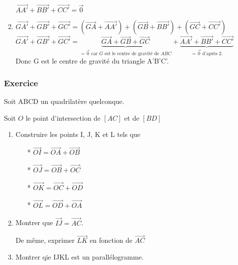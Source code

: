 \begin{enumerate}
$ \overrightarrow{AA'} + \overrightarrow{BB'} + \overrightarrow{CC'} = \overrightarrow{0} $\\

\item $\overrightarrow{GA'} + \overrightarrow{GB'} + \overrightarrow{GC'} = \left(\overrightarrow{GA} + \overrightarrow{AA'} \right) + \left(\overrightarrow{GB} + \overrightarrow{BB'} \right) + \left(\overrightarrow{GC} + \overrightarrow{CC'} \right) $\\

$ \overrightarrow{GA'} + \overrightarrow{GB'} + \overrightarrow{GC'} = \underbrace{\overrightarrow{GA} + \overrightarrow{GB} + \overrightarrow{GC}}_{=\overrightarrow{0} \textrm { car } G \textrm { est le centre de gravité de }  ABC} + \underbrace{\overrightarrow{AA'} + \overrightarrow{BB'} + \overrightarrow{CC'}}_{=\overrightarrow{0} \textrm { d'après } 2.} $\\

Donc G est le centre de gravité du triangle A'B'C'.
\end{enumerate}
\newpage
\subsubsection{Exercice }

Soit ABCD un quadrilatère quelconque.

Soit $O$ le point d'intersection de $\left[AC\right]$ et de $\left[BD\right] $

\begin{enumerate}


\item  Construire les points I, J, K et L tels que 

\begin{itemize}
\item[*]$\overrightarrow{OI} = \overrightarrow{OA} + \overrightarrow{OB} $\\
\item [*]$ \overrightarrow{OJ} = \overrightarrow{OB} + \overrightarrow{OC} $\\
\item [*]$ \overrightarrow{OK} = \overrightarrow{OC} + \overrightarrow{OD} $\\
\item[*] $ \overrightarrow{OL} = \overrightarrow{OD} + \overrightarrow{OA} $\\
\end{itemize}

\item  Montrer que $\overrightarrow{IJ} = \overrightarrow{AC}$.

De même, exprimer $\overrightarrow{LK}$ en fonction de $\overrightarrow{AC}$

\item  Montrer qie IJKL est un parallélogramme.
\end{enumerate}

